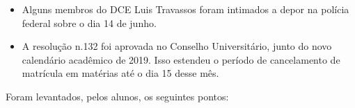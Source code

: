 \documentclass{ata-calico}
\begin{document}
\maketitle

\begin{itemize}
\item Alguns membros do DCE Luis Travassos foram intimados a depor na polícia federal sobre o dia 14 de junho.
\item A resolução n.132 foi aprovada no Conselho Universitário, junto do novo calendário acadêmico de 2019. Isso estendeu o período de cancelamento de matrícula em matérias até o dia 15 desse mês.

\end{itemize}
Foram levantados, pelos alunos, os seguintes pontos:
\end{document}
